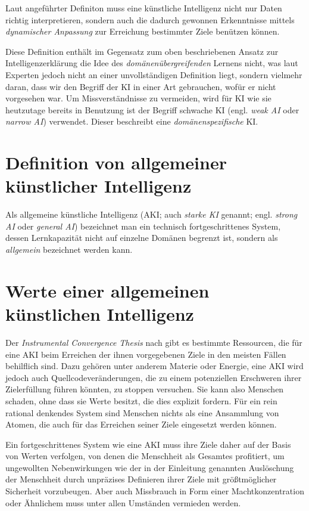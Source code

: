Laut angeführter Definiton muss eine künstliche Intelligenz nicht nur Daten richtig interpretieren, sondern auch die dadurch gewonnen Erkenntnisse mittels \emph{dynamischer Anpassung} zur Erreichung bestimmter Ziele benützen können.

Diese Definition enthält im Gegensatz zum oben beschriebenen Ansatz zur Intelligenzerklärung die Idee des \emph{domänenübergreifenden} Lernens nicht, was laut Experten jedoch nicht an einer unvollständigen Definition liegt, sondern vielmehr daran, dass wir den Begriff der KI in einer Art gebrauchen, wofür er nicht vorgesehen war. Um Missverständnisse zu vermeiden, wird für KI wie sie heutzutage bereits in Benutzung ist der Begriff schwache KI (engl. \emph{weak AI} oder \emph{narrow AI}) verwendet.  Dieser beschreibt eine \emph{domänenspezifische} KI.

\section{Definition von allgemeiner künstlicher Intelligenz}
Als allgemeine künstliche Intelligenz (AKI; auch \emph{starke KI} genannt; engl. \emph{strong AI} oder \emph{general AI}) bezeichnet man ein technisch fortgeschrittenes System, dessen Lernkapazität nicht auf einzelne Domänen begrenzt ist, sondern als \emph{allgemein} bezeichnet werden kann. 

\section{Werte einer allgemeinen künstlichen Intelligenz}  \label{Werte}

Der \emph{Instrumental Convergence Thesis} nach gibt es bestimmte Ressourcen, die für eine AKI beim Erreichen der ihnen vorgegebenen Ziele in den meisten Fällen behilflich sind. Dazu gehören unter anderem Materie oder Energie, eine AKI wird jedoch auch Quellcodeveränderungen, die zu einem potenziellen Erschweren ihrer Zielerfüllung führen könnten, zu stoppen versuchen. Sie kann also Menschen schaden, ohne dass sie Werte besitzt, die dies explizit fordern. Für ein rein rational denkendes System sind Menschen nichts als eine Ansammlung von Atomen, die auch für das Erreichen seiner Ziele eingesetzt werden können.

Ein fortgeschrittenes System wie eine AKI muss ihre Ziele daher auf der Basis von Werten verfolgen, von denen die Menschheit als Gesamtes profitiert, um ungewollten Nebenwirkungen wie der in der Einleitung genannten Auslöschung der Menschheit durch unpräzises Definieren ihrer Ziele mit größtmöglicher Sicherheit vorzubeugen. Aber auch Missbrauch in Form einer Machtkonzentration oder Ähnlichem muss unter allen Umständen vermieden werden.

